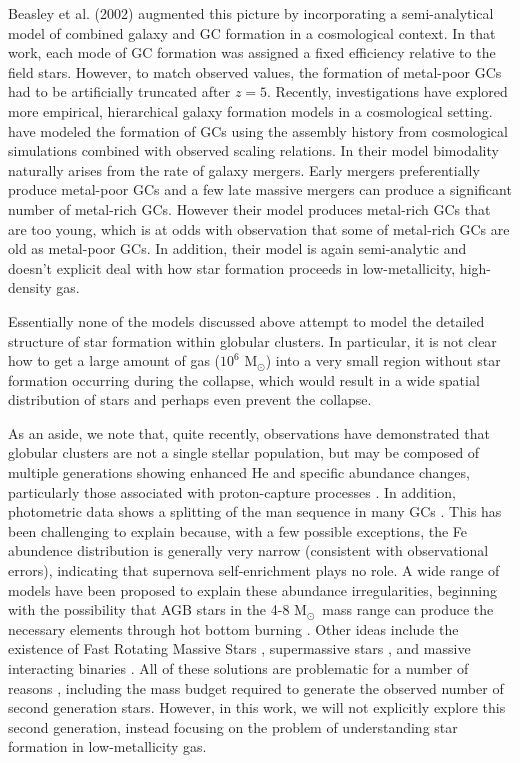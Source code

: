 \documentclass[useAMS,usenatbib]{mn2e}
\newcommand{\msun}{{M$_\odot$}}
\begin{document}
Beasley et al. (2002) augmented this picture by incorporating a semi-analytical model of combined galaxy and GC formation in a cosmological context. In that work, each mode of GC formation was assigned a fixed efficiency relative to the field stars. However, to match observed values, the formation of metal-poor GCs had to be artificially truncated after $z = 5$. Recently, investigations have explored more empirical, hierarchical galaxy formation models in a cosmological setting.   \citet{Muratov2010} have modeled the formation of GCs using the assembly history from cosmological simulations combined with observed scaling relations. In their model bimodality naturally arises from the rate of galaxy mergers. Early mergers preferentially produce metal-poor GCs and a few late massive mergers can produce a significant number of metal-rich GCs.  However their model produces metal-rich GCs that are too young, which is at odds with observation that some of metal-rich GCs are old as metal-poor GCs. In addition, their model is again semi-analytic and doesn't explicit deal with how star formation proceeds in low-metallicity, high-density gas.

Essentially none of the models discussed above attempt to model the detailed structure of star formation within globular clusters.  In particular, it is not clear how to get a large amount of gas ($10^6$ \msun) into a very small region without star formation occurring during the collapse, which would result in a wide spatial distribution of stars and perhaps even prevent the collapse.  

As an aside, we note that, quite recently, observations have demonstrated that globular clusters are not a single stellar population, but may be composed of multiple generations showing enhanced He and specific abundance changes, particularly those associated with proton-capture processes \citep[e.g.,][]{Norris1981, Kraft1994, Gratton2001, Carretta2009}.  In addition, photometric data shows a splitting of the man sequence in many GCs \citet[e.g.,][]{Piotto2009, Anderson2009, Milone2010}.  This has been challenging to explain because, with a few possible exceptions, the Fe abundence distribution is generally very narrow (consistent with observational errors), indicating that supernova self-enrichment plays no role.  A wide range of models have been proposed to explain these abundance irregularities, beginning with the possibility that AGB stars in the 4-8 \msun\ mass range can produce the necessary elements through hot bottom burning \citep[e.g.,][]{DErcole2010, Ventura2013}.  Other ideas include the existence of Fast Rotating Massive Stars \citep[FRMS][]{Krause2013}, supermassive stars \citep{Denissenkov2014,  Denissenkov2015}, and massive interacting binaries \citet[e.g.,][]{deMink2009, Bastian2013}.  All of these solutions are problematic for a number of reasons \citep[e.g.,][]{Renzini2015, Bastian2015}, including the mass budget required to generate the observed number of second generation stars.  However, in this work, we will not explicitly explore this second generation, instead focusing on the problem of understanding star formation in low-metallicity gas.
\end{document}

